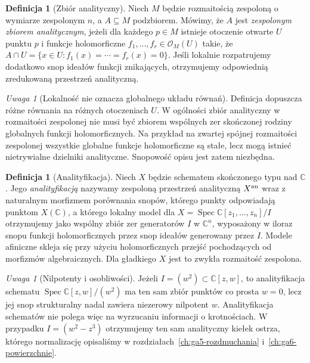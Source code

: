 \documentclass[11pt,a4paper,openany]{report}
\numberwithin{equation}{section}
\theoremstyle{plain}
\theoremstyle{definition}
\newtheorem{definicja}[twierdzenie]{Definicja}
\theoremstyle{remark}
\newtheorem{uwaga}[twierdzenie]{Uwaga}
\newcommand{\C}{\mathbb C}
\begin{document}
\begin{definicja}[Zbiór analityczny]
Niech $M$ będzie rozmaitością zespoloną o wymiarze zespolonym $n$,
a $A\subseteq M$ podzbiorem. Mówimy, że $A$ jest
\emph{zespolonym zbiorem analitycznym}, jeżeli dla każdego $p\in M$
istnieje otoczenie otwarte $U$ punktu $p$ i funkcje holomorficzne
$f_1,\ldots,f_r\in\mathcal O_M(U)$ takie, że
$A\cap U=\{x\in U:f_1(x)=\cdots=f_r(x)=0\}$.
Jeśli lokalnie rozpatrujemy dodatkowo snop ideałów funkcji znikających,
otrzymujemy odpowiednią zredukowaną przestrzeń analityczną.
\end{definicja}

\begin{uwaga}[Lokalność nie oznacza globalnego układu równań]
Definicja dopuszcza różne równania na różnych otoczeniach $U$.
W ogólności zbiór analityczny w rozmaitości zespolonej nie musi być
zbiorem wspólnych zer skończonej rodziny globalnych funkcji
holomorficznych. Na przykład na zwartej spójnej rozmaitości zespolonej
wszystkie globalne funkcje holomorficzne są stałe, lecz mogą istnieć
nietrywialne dzielniki analityczne. Snopowość opisu jest zatem
niezbędna.
\end{uwaga}

\begin{definicja}[Analityfikacja]
Niech $X$ będzie schematem skończonego typu nad $\C$. Jego
\emph{analityfikacją} nazywamy zespoloną przestrzeń analityczną
$X^{\rm an}$ wraz z naturalnym morfizmem porównania snopów, którego
punkty odpowiadają punktom $X(\C)$, a którego lokalny model dla
$X=\operatorname{Spec}\C[z_1,\ldots,z_n]/I$ otrzymujemy jako wspólny
zbiór zer generatorów $I$ w $\C^n$, wyposażony w iloraz snopu
funkcji holomorficznych przez snop ideałów generowany przez $I$.
Modele afiniczne skleja się przy użyciu holomorficznych przejść
pochodzących od morfizmów algebraicznych. Dla gładkiego $X$ jest to
zwykła rozmaitość zespolona.
\end{definicja}

\begin{uwaga}[Nilpotenty i osobliwości]
Jeżeli $I=(w^2)\subset\C[z,w]$, to analityfikacja schematu
$\operatorname{Spec}\C[z,w]/(w^2)$ ma ten sam zbiór punktów co prosta
$w=0$, lecz jej snop strukturalny nadal zawiera niezerowy nilpotent
$w$. Analityfikacja schematów nie polega więc na wyrzucaniu informacji
o krotnościach. W przypadku $I=(w^2-z^3)$ otrzymujemy ten sam
analityczny kiełek ostrza, którego normalizację opisaliśmy w
rozdziałach~\ref{ch:ga5-rozdmuchania} i~\ref{ch:ga6-powierzchnie}.
\end{uwaga}
\end{document}
